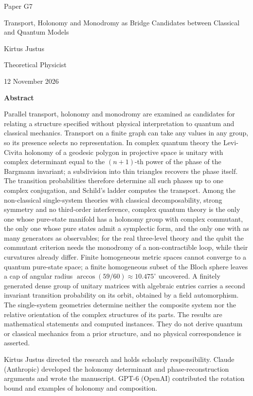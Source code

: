 \documentclass[11pt,a4paper]{article}
\begin{document}
\begin{titlepage}
{\small\sffamily \ProgramTitle\hfill Paper G7\par}
\vspace*{6mm}
{\LARGE\bfseries\raggedright{} Transport, Holonomy and Monodromy as Bridge Candidates between Classical and Quantum Models\par}
\vspace{8mm}
{\large Kirtus Justus\par}
\vspace{1mm}
Theoretical Physicist\par
\AuthorLocation\par
\vspace{2mm}
12 November 2026\par
\vspace{7mm}
\textbf{Abstract}\par
Parallel transport, holonomy and monodromy are examined as candidates for relating a structure specified without physical interpretation to quantum and classical mechanics. Transport on a finite graph can take any values in any group, so its presence selects no representation. In complex quantum theory the Levi-Civita holonomy of a geodesic polygon in projective space is unitary with complex determinant equal to the $(n+1)$-th power of the phase of the Bargmann invariant; a subdivision into thin triangles recovers the phase itself. The transition probabilities therefore determine all such phases up to one complex conjugation, and Schild's ladder computes the transport. Among the non-classical single-system theories with classical decomposability, strong symmetry and no third-order interference, complex quantum theory is the only one whose pure-state manifold has a holonomy group with complex commutant, the only one whose pure states admit a symplectic form, and the only one with as many generators as observables; for the real three-level theory and the qubit the commutant criterion needs the monodromy of a non-contractible loop, while their curvatures already differ. Finite homogeneous metric spaces cannot converge to a quantum pure-state space; a finite homogeneous subset of the Bloch sphere leaves a cap of angular radius $\arccos(59/60)\approx10.475^\circ$ uncovered. A finitely generated dense group of unitary matrices with algebraic entries carries a second invariant transition probability on its orbit, obtained by a field automorphism. The single-system geometries determine neither the composite system nor the relative orientation of the complex structures of its parts. The results are mathematical statements and computed instances. They do not derive quantum or classical mechanics from a prior structure, and no physical correspondence is asserted.\par
\vfill
{\small Kirtus Justus directed the research and holds scholarly responsibility. Claude (Anthropic) developed the holonomy determinant and phase-reconstruction arguments and wrote the manuscript. GPT-6 (OpenAI) contributed the rotation bound and examples of holonomy and composition.\par}
\end{titlepage}
\end{document}
